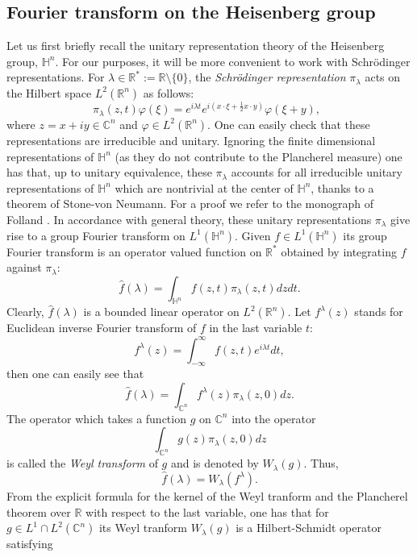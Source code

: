\documentclass[11pt, reqno]{amsart}
\theoremstyle{plain}
\newcommand{\R}{\ensuremath{\mathbb{R_+}}}
\theoremstyle{remark}
\theoremstyle{example}
\theoremstyle{definition}
\numberwithin{equation}{section}
\def\R{\mathbb{R}}
\def\Ha{\mathbb{H}^n}
\def\C{\mathbb{C}}
\newcommand{\Ca}{\mathbb{C}^n}
\begin{document}
\subsection{Fourier transform on the Heisenberg group}
\label{sec:GFT}
Let us first briefly recall the unitary representation theory of the Heisenberg group, $\Ha$. For our purposes, it will be more convenient to work
with Schr\"odinger representations. For  $ \lambda \in  \R^{*}:=\R \setminus \{0\}$, the \emph{Schr\"odinger representation} $ \pi_\lambda $ acts on the Hilbert space $ L^2( \R^n)$ as follows:
$$ \pi_\lambda(z,t) \varphi(\xi) = e^{i\lambda t} e^{i(x \cdot \xi+ \frac{1}{2}x \cdot y)}\varphi(\xi+y),\,\,\,$$
where $ z = x+iy \in \Ca $ and $ \varphi \in L^2(\R^n)$. One can easily check that these representations are irreducible and unitary. Ignoring the finite dimensional representations of $\Ha$ (as they do not contribute to the Plancherel measure) one has that, up to unitary equivalence, these $\pi_{\lambda}$ accounts for all irreducible unitary representations of $\Ha$ which are nontrivial at the center of $\Ha$, thanks to a theorem of Stone-von Neumann. For a proof we refer to the monograph of Folland \cite{Fo}. In accordance with general theory, these unitary representations $\pi_{\lambda}$ give rise to a group Fourier transform on $L^{1}(\Ha)$. Given $f \in L^{1}(\Ha)$ its group Fourier transform is an operator valued function on $\R^{*}$ obtained by integrating $ f $ against $ \pi_\lambda$:
$$ \hat{f}(\lambda) = \int_{\Ha} f(z,t) \pi_\lambda(z,t)  dz dt .$$  
Clearly, $ \hat{f}(\lambda) $ is a bounded linear operator on $ L^2(\R^n).$ Let $ f^\lambda (z) $ stands for Euclidean inverse Fourier transform of $ f $ in the last variable $t$: 
\begin{equation}
\label{eq:inverseFT}
f^\lambda(z) = \int_{-\infty}^\infty f(z,t) e^{i\lambda t} dt,
\end{equation}
then one can easily see that
\begin{equation}
\label{eq:FTbis}
\widehat{f}(\lambda) = \int_{\C^n} f^\lambda(z) \pi_\lambda(z,0) dz.
\end{equation}
The operator which takes  a function $ g $ on $ \C^n $ into the operator
$$ \int_{\C^n} g(z) \pi_\lambda(z,0) dz $$ is called the \emph{Weyl transform} of $ g $ and is denoted by $ W_\lambda(g)$. Thus, 
\begin{equation}
    \widehat{f}(\lambda) = W_\lambda(f^\lambda).
\end{equation}
From the explicit formula for the kernel of the Weyl tranform and the Plancherel theorem over $\R$ with respect to the last variable, one has that for $g \in L^{1} \cap L^2 (\Ca)$ its Weyl tranform $W_{\lambda}(g)$ is a Hilbert-Schmidt operator satisfying
\end{document}
